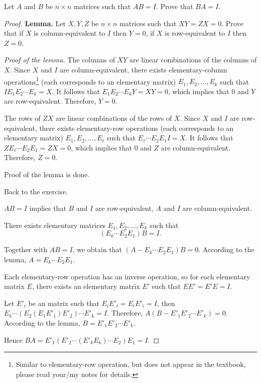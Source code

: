 \begin{exercise}
    Let $A$ and $B$ be $n\times n$ matrices such that $AB = I$. Prove that $BA = I$.
\end{exercise}

\begin{proof}
    \textbf{Lemma.} Let $X, Y, Z$ be $n\times n$ matrices such that $XY = ZX = 0$. Prove that if $X$ is column-equivalent to $I$ then $Y = 0$, if $X$ is row-equivalent to $I$ then $Z = 0$.

    \textit{Proof of the lemma.} The columns of $XY$ are linear combinations of the columns of $X$. Since $X$ and $I$ are column-equivalent, there exists elementary-column operations\footnote{Similar to elementary-row operation, but does not appear in the textbook, please read your/my notes for details.} (each corresponds to an elementary matrix) $E_{1}, E_{2}, \ldots, E_{k}$ such that $IE_{1}E_{2}\cdots E_{k} = X$. It follows that $E_{1}E_{2}\cdots E_{k}Y = XY = 0$, which implies that $0$ and $Y$ are row-equivalent. Therefore, $Y = 0$.

    The rows of $ZX$ are linear combinations of the rows of $X$. Since $X$ and $I$ are row-equivalent, there exists elementary-row operations (each corresponds to an elementary matrix) $E_{1}, E_{2}, \ldots, E_{\ell}$ such that $E_{\ell}\cdots E_{2}E_{1}I = X$. It follows that $ZE_{\ell}\cdots E_{2}E_{1} = ZX = 0$, which implies that $0$ and $Z$ are column-equivalent. Therefore, $Z = 0$.

    Proof of the lemma is done.

    Back to the exercise.

    $AB = I$ implies that $B$ and $I$ are row-equivalent, $A$ and $I$ are column-equivalent.

    There exists elementary matrices $E_{1}, E_{2}, \ldots, E_{k}$ such that
    \[
        (E_{k}\cdots E_{2}E_{1})B = I.
    \]

    Together with $AB = I$, we obtain that $(A - E_{k}\cdots E_{2}E_{1})B = 0$. According to the lemma, $A = E_{k}\cdots E_{2}E_{1}$.

    Each elementary-row operation has an inverse operation, so for each elementary matrix $E$, there exists an elementary matrix $E'$ such that $EE' = E'E = I$.

    Let $E'_{i}$ be an matrix such that $E_{i}E'_{i} = E_{i}E'_{i} = I$, then $E_{k}\cdots (E_{2}(E_{1}E'_{1})E'_{2})\cdots E'_{k} = I$. Therefore, $A(B - E'_{1}E'_{2}\cdots E'_{k}) = 0$. According to the lemma, $B = E'_{1}E'_{2}\cdots E'_{k}$.

    Hence $BA = E'_{1}(E'_{2}\cdots (E'_{k}E_{k})\cdots E_{2}) E_{1} = I$.
\end{proof}

